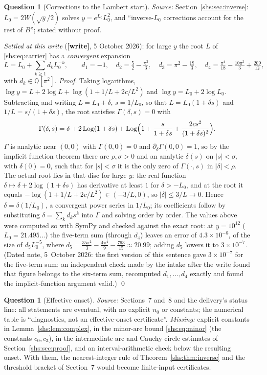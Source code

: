 \documentclass[11pt]{article}
\newcommand{\Log}{\operatorname{Log}}
\theoremstyle{definition}
\newtheorem{question}[theorem]{Question}
\theoremstyle{plain}
\begin{document}
\begin{question}[Corrections to the Lambert start]\label{shs:q:lambert}
\emph{Source:} Section~\ref{shs:sec:inverse}: $L_0=2W(\sqrt y/2)$
solves $y=e^{L_0}L_0^2$, and ``inverse-$L_0$ corrections account for the
rest of $B$''; stated without proof.

\emph{Settled at this write} (\textbf{[write]}, 5 October 2026): for
large $y$ the root $L$ of \eqref{shs:eq:carrier} has a \emph{convergent}
expansion
\[
 L=L_0+\sum_{k\ge1}d_kL_0^{-k},\qquad
 d_1=-1,\quad d_2=\tfrac52-\tfrac{\pi^2}3,\quad
 d_3=\pi^2-\tfrac{19}3,\quad
 d_4=\tfrac{\pi^4}{18}-\tfrac{10\pi^2}3+\tfrac{209}{12},
\]
with $d_k\in\mathbb Q[\pi^2]$. \emph{Proof.} Taking logarithms,
$\log y=L+2\log L+\log(1+1/L+2c/L^2)$ and $\log y=L_0+2\log L_0$.
Subtracting and writing $L=L_0+\delta$, $s=1/L_0$, so that $L=L_0(1+\delta
s)$ and $1/L=s/(1+\delta s)$, the root satisfies $\Gamma(\delta,s)=0$ with
\[
 \Gamma(\delta,s)=\delta+2\Log(1+\delta s)
 +\Log\Bigl(1+\frac s{1+\delta s}+\frac{2cs^2}{(1+\delta s)^2}\Bigr).
\]
$\Gamma$ is analytic near $(0,0)$ with $\Gamma(0,0)=0$ and
$\partial_\delta\Gamma(0,0)=1$, so by the implicit function theorem there
are $\rho,\sigma>0$ and an analytic $\delta(s)$ on $|s|<\sigma$, with
$\delta(0)=0$, such that for $|s|<\sigma$ it is the only zero of
$\Gamma(\cdot,s)$ in $|\delta|<\rho$. The actual root lies in that disc
for large $y$: the real function $\delta\mapsto\delta+2\log(1+\delta s)$
has derivative at least $1$ for $\delta>-L_0$, and at the root it equals
$-\log(1+1/L+2c/L^2)\in(-3/L,0)$, so $|\delta|\le3/L\to0$. Hence
$\delta=\delta(1/L_0)$, a convergent power series in $1/L_0$; its
coefficients follow by substituting $\delta=\sum_kd_ks^k$ into $\Gamma$
and solving order by order. The values above were computed so with SymPy
and checked against the exact root: at $y=10^{12}$ ($L_0=21.495\ldots$)
the five-term sum (through $d_4$) leaves an error of $4.3\times10^{-6}$,
of the size of $d_5L_0^{-5}$, where
$d_5=\tfrac{35\pi^2}{3}-\tfrac{4\pi^4}{9}-\tfrac{763}{15}\approx20.99$;
adding $d_5$ lowers it to $3\times10^{-7}$. (Dated note, 5~October 2026:
the first version of this sentence gave $3\times10^{-7}$ for the five-term
sum; an independent check made by the intake after the write found that
figure belongs to the six-term sum, recomputed $d_1,\dots,d_4$ exactly and
found the implicit-function argument valid.) \qed
\end{question}

\begin{question}[Effective onset]\label{shs:q:onset}
\emph{Source:} Sections~7 and~8 and the delivery's status line: all
statements are eventual, with no explicit $n_0$ or constants; the
numerical table is ``diagnostics, not an effective-onset certificate''.
\emph{Missing:} explicit constants in Lemma~\ref{shs:lem:complex}, in the
minor-arc bound \eqref{shs:eq:minor} (the constants $c_0,c_3$), in the
intermediate-arc and Cauchy-circle estimates of
Section~\ref{shs:sec:proof}, and an interval-arithmetic check below the
resulting onset. With them, the nearest-integer rule of
Theorem~\ref{shs:thm:inverse} and the threshold bracket of Section~7 would
become finite-input certificates.
\end{question}
\end{document}
